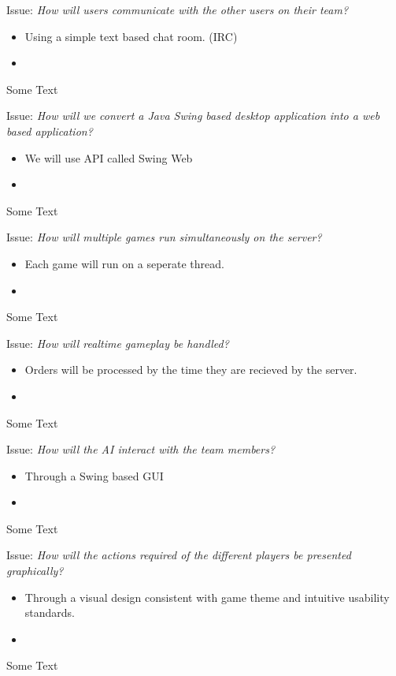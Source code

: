 Issue: \textit{How will users communicate with the other users on their team?}

  \begin{itemize}
    \item Using a simple text based chat room. (IRC)
    \item 
  \end{itemize}

Some Text

Issue: \textit{How will we convert a Java Swing based desktop application into a web based application?}

  \begin{itemize}
    \item We will use API called Swing Web
    \item 
  \end{itemize}

Some Text

Issue: \textit{How will multiple games run simultaneously on the server?}

  \begin{itemize}
    \item Each game will run on a seperate thread.
    \item 
  \end{itemize}

Some Text

Issue: \textit{How will realtime gameplay be handled?}

  \begin{itemize}
    \item Orders will be processed by the time they are recieved by the server.
    \item 
  \end{itemize}

Some Text

Issue: \textit{How will the AI interact with the team members?}

  \begin{itemize}
    \item Through a Swing based GUI
    \item 
  \end{itemize}

Some Text

Issue: \textit{How will the actions required of the different players be presented graphically?}

  \begin{itemize}
    \item Through a visual design consistent with game theme and intuitive usability standards.
    \item 
  \end{itemize}

Some Text
